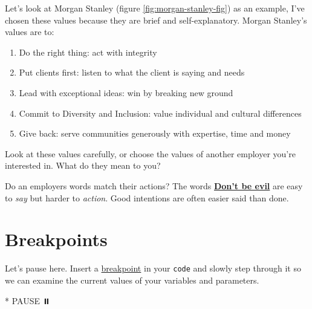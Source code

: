\documentclass[
]{book}
\newenvironment{Shaded}{\begin{snugshade}}{\end{snugshade}}
\newcommand{\NormalTok}[1]{#1}
\newcommand{\SpecialStringTok}[1]{\textcolor[rgb]{0.31,0.60,0.02}{#1}}
\providecommand{\tightlist}{%
  \setlength{\itemsep}{0pt}\setlength{\parskip}{0pt}}
\begin{document}
Let's look at Morgan Stanley (figure \ref{fig:morgan-stanley-fig}) as an example, I've chosen these values because they are brief and self-explanatory. Morgan Stanley's values are to:

\begin{enumerate}
\def\labelenumi{\arabic{enumi}.}
\tightlist
\item
  Do the right thing: act with integrity
\item
  Put clients first: listen to what the client is saying and needs
\item
  Lead with exceptional ideas: win by breaking new ground
\item
  Commit to Diversity and Inclusion: value individual and cultural differences
\item
  Give back: serve communities generously with expertise, time and money
\end{enumerate}

Look at these values carefully, or choose the values of another employer you're interested in. What do they mean to you?

Do an employers words match their actions? The words \textbf{\href{https://en.wikipedia.org/wiki/Don\%27t_be_evil}{Don't be evil}} are easy to \emph{say} but harder to \emph{action}. Good intentions are often easier said than done.

\hypertarget{bp9}{%
\section{Breakpoints}\label{bp9}}

Let's pause here. Insert a \href{https://en.wikipedia.org/wiki/Breakpoint}{breakpoint} in your \texttt{code} and slowly step through it so we can examine the current values of your variables and parameters.

\begin{Shaded}
\begin{Highlighting}[]
\SpecialStringTok{* }\NormalTok{PAUSE ⏸️}
\end{Highlighting}
\end{Shaded}
\end{document}
